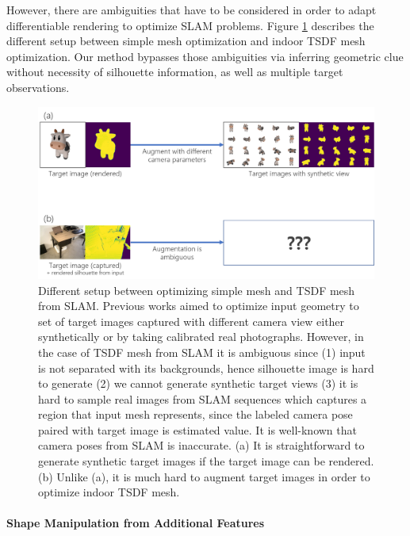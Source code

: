 However, there are ambiguities that have to be considered in order to adapt differentiable rendering to optimize SLAM problems. 
Figure \ref{fig:difference_simple_mesh_and_tsdf_mesh} describes the different setup between simple mesh optimization and indoor TSDF mesh optimization. 
Our method bypasses those ambiguities via inferring geometric clue 
without necessity of silhouette information, as well as multiple target observations.
\begin{figure}
    \includegraphics[width=\columnwidth]{figures/2_prev_difference_simple_mesh_and_tsdf_mesh.png}
    \caption{Different setup between optimizing simple mesh and TSDF mesh from SLAM. Previous works aimed to optimize input geometry to set of target images captured with different camera view either synthetically\cite{ravi2020accelerating}\cite{jatavallabhula2019kaolin}\cite{laine2020modular}\cite{nimier2019mitsuba} or by taking calibrated real photographs\cite{nimier2019mitsuba}. However, in the case of TSDF mesh from SLAM it is ambiguous since (1) input is not separated with its backgrounds, hence silhouette image is hard to generate (2) we cannot generate synthetic target views (3) it is hard to sample real images from SLAM sequences which captures a region that input mesh represents, since the labeled camera pose paired with target image is estimated value. It is well-known that camera poses from SLAM is inaccurate. (a) It is straightforward to generate synthetic target images if the target image can be rendered. (b) Unlike (a), it is much hard to augment target images in order to optimize indoor TSDF mesh.}
    \label{fig:difference_simple_mesh_and_tsdf_mesh}
\end{figure}

\paragraph{Shape Manipulation from Additional Features}
